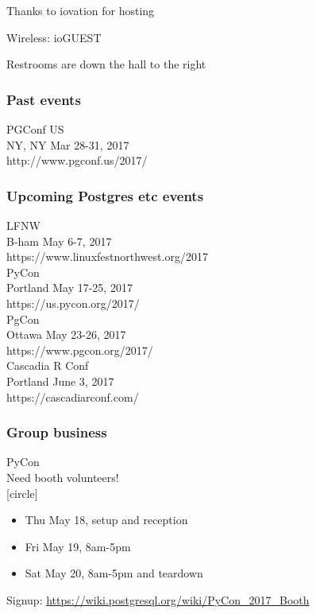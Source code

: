 \documentclass{beamer}
\begin{document}

\frame
{
  \begin{center}
  \item[]Thanks to iovation for hosting
  \item[]Wireless: ioGUEST
  \item[]Restrooms are down the hall to the right
  \end{center}
}

\frame
{
  \frametitle{Past events}
  \begin{center}
 {\large PGConf US\\}
NY, NY Mar 28-31, 2017\\
http://www.pgconf.us/2017/\\
  \vspace{5mm}
  \end{center}
}

\frame
{
  \frametitle{Upcoming Postgres etc events}
  \begin{center}
 {\large LFNW\\}
 B-ham May 6-7, 2017\\
 https://www.linuxfestnorthwest.org/2017\\
   \vspace{5mm}
 {\large PyCon\\}
 Portland May 17-25, 2017\\
 https://us.pycon.org/2017/\\
   \vspace{5mm}
 {\large PgCon\\}
 Ottawa May 23-26, 2017\\
 https://www.pgcon.org/2017/\\
   \vspace{5mm}
 {\large Cascadia R Conf\\}
 Portland June 3, 2017\\
 https://cascadiarconf.com/
  \end{center}
}

\frame
{
  \frametitle{Group business}
  \begin{center}
{\large PyCon\\}
Need booth volunteers!\\
[circle]
\begin{itemize}
\item Thu May 18, setup and reception\\
\item Fri May 19, 8am-5pm\\
\item Sat May 20, 8am-5pm and teardown\\
\end{itemize}
\vspace{5mm}
Signup: \url{https://wiki.postgresql.org/wiki/PyCon_2017_Booth}
\vspace{5mm}
  \end{center}
}
\end{document}
